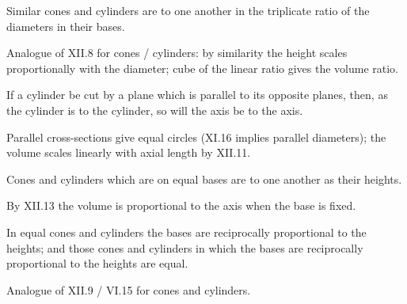 \begin{claim}
\label{prop:XII.12}
Similar cones and cylinders are to one another in the triplicate
ratio of the diameters in their bases.
\end{claim}
\begin{evidence}
\label{ev:XII.12}
Analogue of XII.8 for cones / cylinders: by similarity the height
scales proportionally with the diameter; cube of the linear ratio
gives the volume ratio.
\end{evidence}

\begin{claim}
\label{prop:XII.13}
If a cylinder be cut by a plane which is parallel to its opposite
planes, then, as the cylinder is to the cylinder, so will the axis
be to the axis.
\end{claim}
\begin{evidence}
\label{ev:XII.13}
Parallel cross-sections give equal circles (XI.16 implies parallel
diameters); the volume scales linearly with axial length by XII.11.
\end{evidence}

\begin{claim}
\label{prop:XII.14}
Cones and cylinders which are on equal bases are to one another as
their heights.
\end{claim}
\begin{evidence}
\label{ev:XII.14}
By XII.13 the volume is proportional to the axis when the base is
fixed.
\end{evidence}

\begin{claim}
\label{prop:XII.15}
In equal cones and cylinders the bases are reciprocally proportional
to the heights; and those cones and cylinders in which the bases
are reciprocally proportional to the heights are equal.
\end{claim}
\begin{evidence}
\label{ev:XII.15}
Analogue of XII.9 / VI.15 for cones and cylinders.
\end{evidence}

